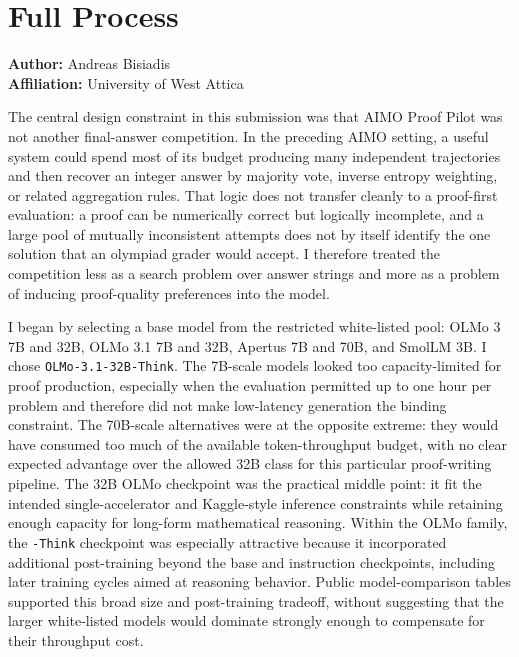 \section*{Full Process}

\noindent\textbf{Author:} Andreas Bisiadis\\
\textbf{Affiliation:} University of West Attica

\begingroup
\sloppy

The central design constraint in this submission was that AIMO Proof Pilot was not another final-answer competition. In the preceding AIMO setting, a useful system could spend most of its budget producing many independent trajectories and then recover an integer answer by majority vote, inverse entropy weighting, or related aggregation rules. That logic does not transfer cleanly to a proof-first evaluation: a proof can be numerically correct but logically incomplete, and a large pool of mutually inconsistent attempts does not by itself identify the one solution that an olympiad grader would accept. I therefore treated the competition less as a search problem over answer strings and more as a problem of inducing proof-quality preferences into the model.

I began by selecting a base model from the restricted white-listed pool: OLMo 3 7B and 32B, OLMo 3.1 7B and 32B, Apertus 7B and 70B, and SmolLM 3B. I chose \texttt{OLMo-3.1-32B-Think}. The 7B-scale models looked too capacity-limited for proof production, especially when the evaluation permitted up to one hour per problem and therefore did not make low-latency generation the binding constraint. The 70B-scale alternatives were at the opposite extreme: they would have consumed too much of the available token-throughput budget, with no clear expected advantage over the allowed 32B class for this particular proof-writing pipeline. The 32B OLMo checkpoint was the practical middle point: it fit the intended single-accelerator and Kaggle-style inference constraints while retaining enough capacity for long-form mathematical reasoning. Within the OLMo family, the \texttt{-Think} checkpoint was especially attractive because it incorporated additional post-training beyond the base and instruction checkpoints, including later training cycles aimed at reasoning behavior. Public model-comparison tables supported this broad size and post-training tradeoff, without suggesting that the larger white-listed models would dominate strongly enough to compensate for their throughput cost.

